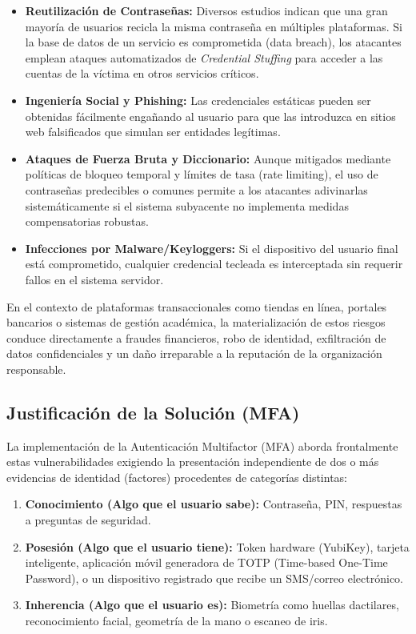 \documentclass[12pt,a4paper]{article}
\begin{document}
\begin{itemize}
    \item \textbf{Reutilización de Contraseñas:} Diversos estudios indican que una gran mayoría de usuarios recicla la misma contraseña en múltiples plataformas. Si la base de datos de un servicio es comprometida (data breach), los atacantes emplean ataques automatizados de \textit{Credential Stuffing} para acceder a las cuentas de la víctima en otros servicios críticos.
    \item \textbf{Ingeniería Social y Phishing:} Las credenciales estáticas pueden ser obtenidas fácilmente engañando al usuario para que las introduzca en sitios web falsificados que simulan ser entidades legítimas.
    \item \textbf{Ataques de Fuerza Bruta y Diccionario:} Aunque mitigados mediante políticas de bloqueo temporal y límites de tasa (rate limiting), el uso de contraseñas predecibles o comunes permite a los atacantes adivinarlas sistemáticamente si el sistema subyacente no implementa medidas compensatorias robustas.
    \item \textbf{Infecciones por Malware/Keyloggers:} Si el dispositivo del usuario final está comprometido, cualquier credencial tecleada es interceptada sin requerir fallos en el sistema servidor.
\end{itemize}

En el contexto de plataformas transaccionales como tiendas en línea, portales bancarios o sistemas de gestión académica, la materialización de estos riesgos conduce directamente a fraudes financieros, robo de identidad, exfiltración de datos confidenciales y un daño irreparable a la reputación de la organización responsable.

\subsection{Justificación de la Solución (MFA)}

La implementación de la Autenticación Multifactor (MFA) aborda frontalmente estas vulnerabilidades exigiendo la presentación independiente de dos o más evidencias de identidad (factores) procedentes de categorías distintas:

\begin{enumerate}
    \item \textbf{Conocimiento (Algo que el usuario sabe):} Contraseña, PIN, respuestas a preguntas de seguridad.
    \item \textbf{Posesión (Algo que el usuario tiene):} Token hardware (YubiKey), tarjeta inteligente, aplicación móvil generadora de TOTP (Time-based One-Time Password), o un dispositivo registrado que recibe un SMS/correo electrónico.
    \item \textbf{Inherencia (Algo que el usuario es):} Biometría como huellas dactilares, reconocimiento facial, geometría de la mano o escaneo de iris.
\end{enumerate}
\end{document}
